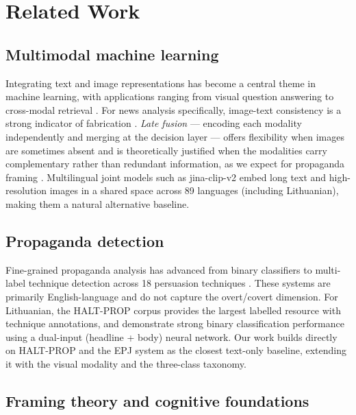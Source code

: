 \documentclass[12pt,a4paper]{article}
\begin{document}
\section{Related Work}
\label{sec:related}

\subsection{Multimodal machine learning}

Integrating text and image representations has become a central theme in
machine learning, with applications ranging from visual question answering to
cross-modal retrieval \parencite{liang2023multimodal}.
For news analysis specifically, image-text consistency is a strong indicator
of fabrication \parencite{liang2023multimodal}.
\textit{Late fusion} --- encoding each modality independently and merging at
the decision layer --- offers flexibility when images are sometimes absent and
is theoretically justified when the modalities carry complementary rather
than redundant information, as we expect for propaganda framing
\parencite{liang2023multimodal}.
Multilingual joint models such as jina-clip-v2 \parencite{jinaclip2024} embed
long text and high-resolution images in a shared space across 89 languages
(including Lithuanian), making them a natural alternative baseline.

\subsection{Propaganda detection}

Fine-grained propaganda analysis has advanced from binary classifiers to
multi-label technique detection across 18 persuasion techniques
\parencite{dasanmartino2019proppy}.
These systems are primarily English-language and do not capture the
overt/covert dimension.
For Lithuanian, the HALT-PROP corpus \parencite{haltprop2025} provides
the largest labelled resource with technique annotations, and
\textcite{vasnetsov2026dualinput} demonstrate strong binary classification
performance using a dual-input (headline + body) neural network.
Our work builds directly on HALT-PROP and the EPJ system as the closest
text-only baseline, extending it with the visual modality and the three-class
taxonomy.

\subsection{Framing theory and cognitive foundations}
\end{document}
